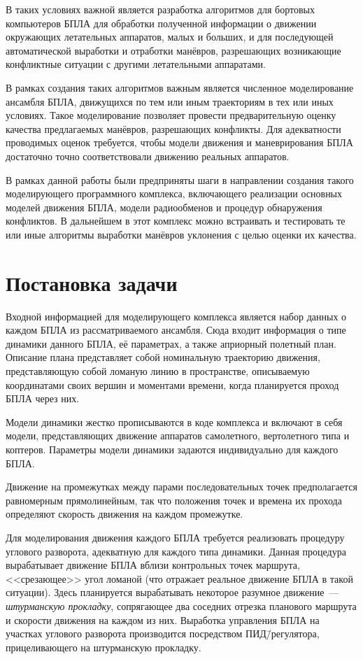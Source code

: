 \documentclass[a4paper,12pt]{article}
\numberwithin{figure}{subsubsection}
\begin{document}
В таких условиях важной является разработка алгоритмов для бортовых компьютеров БПЛА для обработки полученной информации о движении окружающих летательных аппаратов, малых и больших, и для последующей автоматической выработки и отработки манёвров, разрешающих возникающие конфликтные ситуации с другими летательными аппаратами. 

В рамках создания таких алгоритмов важным является численное моделирование ансамбля БПЛА, движущихся по тем или иным траекториям в тех или иных условиях. Такое моделирование позволяет провести предварительную оценку качества предлагаемых манёвров, разрешающих конфликты. Для адекватности проводимых оценок требуется, чтобы модели движения и маневрирования БПЛА достаточно точно соответствовали движению реальных аппаратов. 

В рамках данной работы были предприняты шаги в направлении создания такого моделирующего программного комплекса, включающего реализации основных моделей движения БПЛА, модели радиообменов и процедур обнаружения конфликтов. В дальнейшем в этот комплекс можно встраивать и тестировать те или иные алгоритмы выработки манёвров уклонения с целью оценки их качества.

\newpage

\section{Постановка задачи}

Входной информацией для моделирующего комплекса является набор данных о каждом БПЛА из рассматриваемого ансамбля. Сюда входит информация о типе динамики данного БПЛА, её параметрах, а также априорный полетный план. Описание плана представляет собой номинальную траекторию движения, представляющую собой ломаную линию в пространстве, описываемую координатами своих вершин и моментами времени, когда планируется проход БПЛА через них.

Модели динамики жестко прописываются в коде комплекса и включают в себя модели, представляющих движение аппаратов самолетного, вертолетного типа и коптеров. Параметры модели динамики задаются индивидуально для каждого БПЛА.

Движение на промежутках между парами последовательных точек предполагается равномерным прямолинейным, так что положения точек и времена их прохода определяют скорость движения на каждом промежутке. 

Для моделирования движения каждого БПЛА требуется реализовать процедуру углового разворота, адекватную для каждого типа динамики. Данная процедура вырабатывает движение БПЛА вблизи контрольных точек маршрута, <<срезающее>> угол ломаной (что отражает реальное движение БПЛА в такой ситуации). Здесь планируется вырабатывать некоторое разумное движение~--- \textit{штурманскую прокладку}, сопрягающее два соседних отрезка планового маршрута и скорости движения на каждом из них. Выработка управления БПЛА на участках углового разворота производится посредством ПИД\=/регулятора, прицеливающего на штурманскую прокладку.
\end{document}
